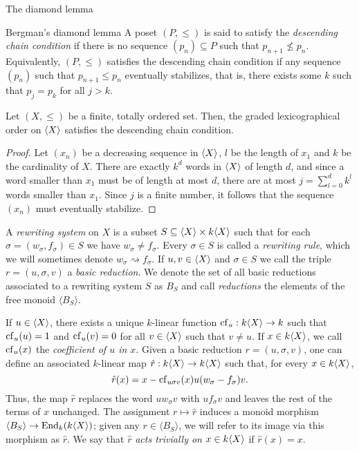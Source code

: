 \begin{chapter}{The diamond lemma}
\begin{section}{Bergman's diamond lemma}
A poset $(P,\leq)$ is said to satisfy the \emph{descending chain condition} if there is no sequence $(p_n)\subseteq P$ such that $p_{n+1}\not \leq p_n$. Equivalently, $(P,\leq)$ satisfies the descending chain condition if any sequence $(p_n)$ such that $p_{n+1} \leq p_n$ eventually stabilizes, that is, there exists some $k$ such that $p_j = p_k$ for all $j>k$.

\begin{lemma}\label{noeth} Let $(X,\leq)$ be a finite, totally ordered set. Then, the graded lexicographical order on $\langle X\rangle$ satisfies the descending chain condition.
\end{lemma}
\begin{proof} Let $(x_n)$ be a decreasing sequence in $\langle X\rangle$, $l$ be the length of $x_1$ and $k$ be the cardinality of $X$. There are exactly $k^d$ words in $\langle X\rangle$ of length $d$, and since a word smaller than $x_1$ must be of length at most $d$, there are at most $j=\sum_{l=0}^d k^l$ words smaller than $x_1$. Since $j$ is a finite number, it follows that the sequence $(x_n)$ must eventually stabilize.
\end{proof}

A \emph{rewriting system} on $X$ is a subset $S\subseteq \langle X\rangle \times k\langle X\rangle$ such that for each $\sigma=(w_\sigma, f_\sigma)\in S$ we have $w_\sigma \neq f_\sigma$. Every $\sigma \in S$ is called a \emph{rewriting rule}, which we will sometimes denote $w_\sigma \rightsquigarrow f_\sigma$. If $u,v\in\langle X\rangle$ and $\sigma\in S$ we call the triple $r=(u,\sigma,v)$ a \emph{basic reduction}. We denote the set of all basic reductions associated to a rewriting system $S$ as $B_S$ and call \emph{reductions} the elements of the free monoid $\langle B_S\rangle$.

If $u\in\langle X\rangle$, there exists a unique $k$-linear function $\mathrm{cf}_u:k\langle X\rangle\to k$ such that $\mathrm{cf}_u(u)=1$ and $\mathrm{cf}_u(v)=0$ for all $v\in\langle X\rangle$ such that $v\neq u$. If $x\in k\langle X\rangle$, we call $\mathrm{cf}_u(x)$ the \emph{coefficient of $u$ in $x$}. Given a basic reduction $r=(u,\sigma,v)$, one can define an associated $k$-linear map $\hat{r}:k\langle X\rangle\to k\langle X\rangle$ such that, for every $x\in k\langle X\rangle$,
\[\hat{r}(x)=x-\mathrm{cf}_{u\sigma v}(x) u(w_\sigma - f_\sigma)v.\]
Thus, the map $\hat{r}$ replaces the word $uw_\sigma v$ with $uf_\sigma v$ and leaves the rest of the terms of $x$ unchanged. The assignment $r\mapsto \hat{r}$ induces a monoid morphism $\langle B_S\rangle \to \operatorname{End}_k(k\langle X\rangle)$; given any $r\in\langle B_S\rangle$, we will refer to its image via this morphism as $\hat{r}$. We say that $\hat{r}$ \emph{acts trivially on $x\in k\langle X\rangle$} if $\hat{r}(x)=x$.


\end{section}
\end{chapter}
